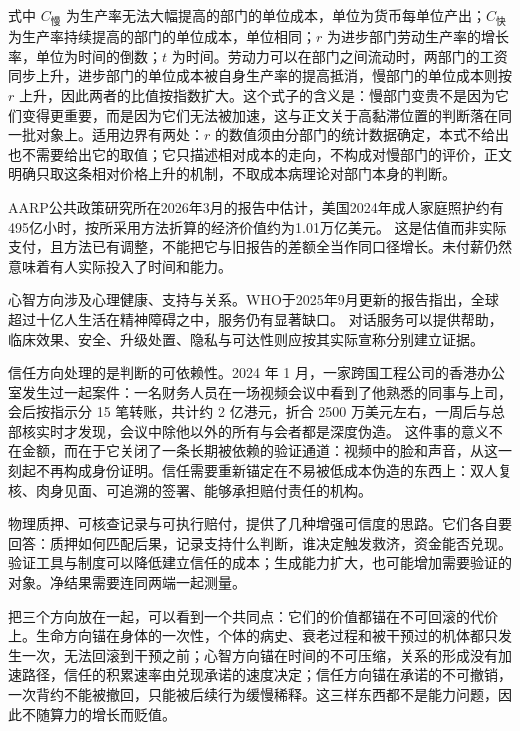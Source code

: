 式中 $C_{\text{慢}}$ 为生产率无法大幅提高的部门的单位成本，单位为货币每单位产出；$C_{\text{快}}$ 为生产率持续提高的部门的单位成本，单位相同；$r$ 为进步部门劳动生产率的增长率，单位为时间的倒数；$t$ 为时间。劳动力可以在部门之间流动时，两部门的工资同步上升，进步部门的单位成本被自身生产率的提高抵消，慢部门的单位成本则按 $r$ 上升，因此两者的比值按指数扩大。这个式子的含义是：慢部门变贵不是因为它们变得更重要，而是因为它们无法被加速，这与正文关于高黏滞位置的判断落在同一批对象上。适用边界有两处：$r$ 的数值须由分部门的统计数据确定，本式不给出也不需要给出它的取值；它只描述相对成本的走向，不构成对慢部门的评价，正文明确只取这条相对价格上升的机制，不取成本病理论对部门本身的判断。

AARP公共政策研究所在2026年3月的报告中估计，美国2024年成人家庭照护约有495亿小时，按所采用方法折算的经济价值约为1.01万亿美元。\cite{aarp2026valuing} 这是估值而非实际支付，且方法已有调整，不能把它与旧报告的差额全当作同口径增长。未付薪仍然意味着有人实际投入了时间和能力。

心智方向涉及心理健康、支持与关系。WHO于2025年9月更新的报告指出，全球超过十亿人生活在精神障碍之中，服务仍有显著缺口。\cite{who2025mental} 对话服务可以提供帮助，临床效果、安全、升级处置、隐私与可达性则应按其实际宣称分别建立证据。

信任方向处理的是判断的可依赖性。2024 年 1 月，一家跨国工程公司的香港办公室发生过一起案件：一名财务人员在一场视频会议中看到了他熟悉的同事与上司，会后按指示分 15 笔转账，共计约 2 亿港元，折合 2500 万美元左右，一周后与总部核实时才发现，会议中除他以外的所有与会者都是深度伪造。\cite{hk2024deepfake} 这件事的意义不在金额，而在于它关闭了一条长期被依赖的验证通道：视频中的脸和声音，从这一刻起不再构成身份证明。信任需要重新锚定在不易被低成本伪造的东西上：双人复核、肉身见面、可追溯的签署、能够承担赔付责任的机构。

物理质押、可核查记录与可执行赔付，提供了几种增强可信度的思路。它们各自要回答：质押如何匹配后果，记录支持什么判断，谁决定触发救济，资金能否兑现。验证工具与制度可以降低建立信任的成本；生成能力扩大，也可能增加需要验证的对象。净结果需要连同两端一起测量。


把三个方向放在一起，可以看到一个共同点：它们的价值都锚在不可回滚的代价上。生命方向锚在身体的一次性，个体的病史、衰老过程和被干预过的机体都只发生一次，无法回滚到干预之前；心智方向锚在时间的不可压缩，关系的形成没有加速路径，信任的积累速率由兑现承诺的速度决定；信任方向锚在承诺的不可撤销，一次背约不能被撤回，只能被后续行为缓慢稀释。这三样东西都不是能力问题，因此不随算力的增长而贬值。

